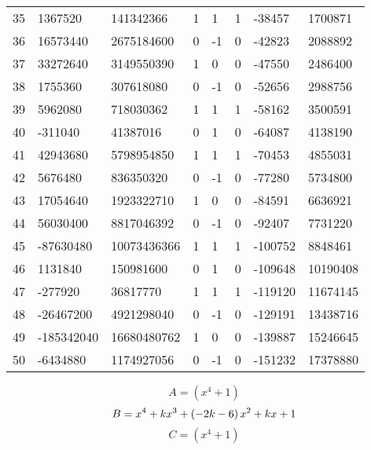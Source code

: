 \documentclass{amsart}
\begin{document}
\begin{longtable}{|l|l|l|lllll|}
35&1367520&141342366&1&1&1&-38457&1700871\\
36&16573440&2675184600&0&-1&0&-42823&2088892\\
37&33272640&3149550390&1&0&0&-47550&2486400\\
38&1755360&307618080&0&-1&0&-52656&2988756\\
39&5962080&718030362&1&1&1&-58162&3500591\\
40&-311040&41387016&0&1&0&-64087&4138190\\
41&42943680&5798954850&1&1&1&-70453&4855031\\
42&5676480&836350320&0&-1&0&-77280&5734800\\
43&17054640&1923322710&1&0&0&-84591&6636921\\
44&56030400&8817046392&0&-1&0&-92407&7731220\\
45&-87630480&10073436366&1&1&1&-100752&8848461\\
46&1131840&150981600&0&1&0&-109648&10190408\\
47&-277920&36817770&1&1&1&-119120&11674145\\
48&-26467200&4921298040&0&-1&0&-129191&13438716\\
49&-185342040&16680480762&1&0&0&-139887&15246645\\
50&-6434880&1174927056&0&-1&0&-151232&17378880\\
\hline
\end{longtable}
$$A=(x^4
 + 1)$$
$$B=x^4
 + k\*x^3
 + \left(-2\*k
 - 6\right) \*x^2
 + k\*x
 + 1$$
$$C=(x^4
 + 1)$$
\end{document}
